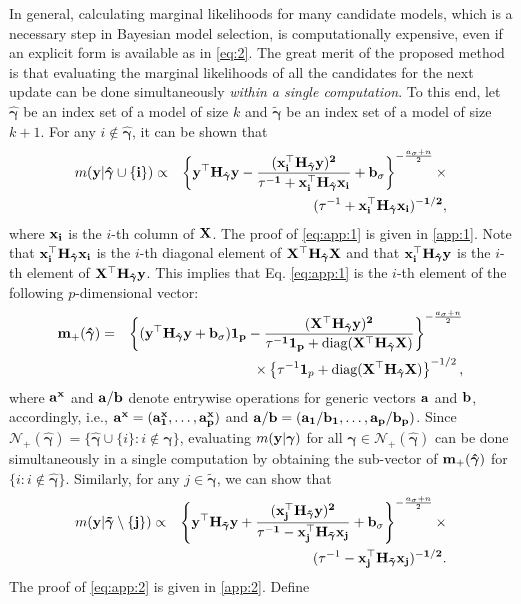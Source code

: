 \documentclass[twocolumn]{svjour3}       %
\newcommand{\T}{\top} %
\newcommand{\ua}{\bf a} %
\newcommand{\ub}{\bf b} %
\newcommand{\uH}{\bf H} %
\newcommand{\uX}{\bf X} %
\newcommand{\ux}{\bf x} %
\newcommand{\uy}{\bf y} %
\newcommand{\um}{\bf m} %
\newcommand{\0}{\boldsymbol 0} %
\newcommand{\1}{\boldsymbol 1} %
\newcommand{\bg}{\boldsymbol \gamma} %
\newcommand{\diag}{\rm diag}
\begin{document}
In general, calculating marginal likelihoods for many candidate models, which is a necessary step in Bayesian model selection, is computationally expensive, even if an explicit form is available as in \eqref{eq:2}. The great merit of the proposed method is that evaluating the marginal likelihoods of all the candidates for the next update can be done simultaneously \emph{within a single computation}. To this end, let $\hat{\bg}$ be an index set of a model of size $k$ and $\tilde{\bg}$ be an index set of a model of size $k+1$. For any $i\notin \hat{\bg}$, it can be shown that
\begin{eqnarray}\label{eq:app:1}
 m(\uy|\hat{\bg}\cup\{i\}) &\propto& \left\{\uy^{\T}\uH_{\hat{\bg}}\uy-\frac{(
  \ux_i^{\T}\uH_{\hat{\bg}}\uy)^2}{\tau^{-1}+\ux_i^{\T}\uH_{\hat{\bg}} \ux_i }+b_{\sigma}\right\}^
 {-\frac{a_{\sigma}+n}{2}}\times\nonumber\\
 &&(\tau^{-1}+\ux_i^{\T}\uH_{\hat{\bg}} \ux_i)^{-1/2},
\end{eqnarray}
where $\ux_i$ is the $i$-th column of $\uX$. The proof of \eqref{eq:app:1} is given in \ref{app:1}. Note that $\ux_i^{\T}\uH_{\hat{\bg}}\ux_i$ is the $i$-th diagonal element of $\uX^{\T}\uH_{\hat{\bg}}\uX$ and that $\ux_i^{\T}\uH_{\hat{\bg}}\uy$ is the $i$-th element of $\uX^{\T}\uH_{\hat{\bg}}\uy$. This implies that Eq. \eqref{eq:app:1} is the $i$-th element of the following $p$-dimensional vector:
\begin{eqnarray*}
\um_+({\hat{\bg}})&=& \left\{(\uy^{\T}\uH_{\hat{\bg}}\uy+b_{\sigma}) \1_p-\frac{(\uX^{\T}\uH_{\hat{\bg}}\uy)^2}{\tau^{-1}\1_p+\diag(\uX^{\T}\uH_{\hat{\bg}}\uX) } \right\}^
 {-\frac{a_{\sigma}+n}{2}}\\
 &&\times\left\{\tau^{-1} \1_p  +\diag(\uX^{\T}\uH_{\hat{\bg}}\uX) \right\}^{-1/2},
 \end{eqnarray*}
 where $\ua^x$ and $\ua/\ub$ denote entrywise operations for generic vectors $\ua$ and $\ub$, accordingly, i.e., $\ua^x=(a_1^x,\ldots, a_p^x)$ and $\ua/\ub=(a_1/b_1,\ldots,a_p/b_p)$. Since $\mathcal{N}_+(\hat{\bg})=\{\hat{\bg} \cup \{i\}:i\notin \hat{\bg} \}$, evaluating $m(\uy|\bg)$ for all $\bg \in \mathcal{N}_+(\hat{\bg} )$ can be done simultaneously in a single computation by obtaining the sub-vector of $\um_+({\hat{\bg}})$ for $\{i:i\notin \hat{\bg} \}$. Similarly, for any $j \in\tilde{\bg}$, we can show that 
 \begin{eqnarray}\label{eq:app:2}
 m(\uy|\tilde{\bg}\setminus \{j\})  &\propto& \left\{\uy^{\T}\uH_{\tilde{\bg}}\uy+\frac{(
  \ux_j^{\T}\uH_{\tilde{\bg}}\uy)^2}{\tau^{-1}-\ux_j^{\T}\uH_{\tilde{\bg}} \ux_j }+b_{\sigma}\right\}^
 {-\frac{a_{\sigma}+n}{2}}\times\nonumber\\
 &&(\tau^{-1}-\ux_j^{\T}\uH_{\tilde{\bg}} \ux_j)^{-1/2}.
\end{eqnarray} The proof of \eqref{eq:app:2} is given in \ref{app:2}. Define
\end{document}
